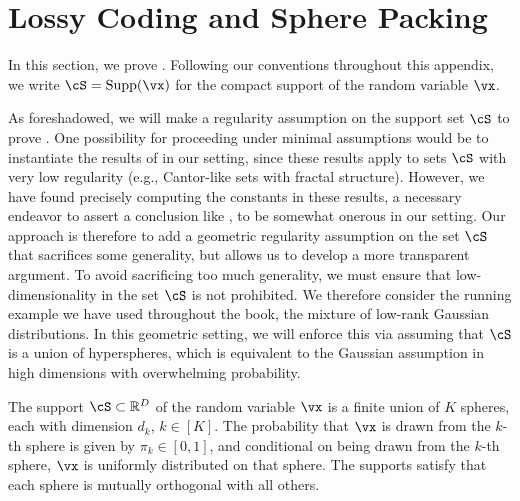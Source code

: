 \documentclass[../../book-main.tex]{subfiles}
\begin{document}
\section{Lossy Coding and Sphere Packing}\label{app:rate-distortion-covering}

In this section, we prove .
Following our conventions throughout this appendix, we write $\cS = \Supp(\vx)$
for the compact support of the random variable $\vx$.

As foreshadowed, we will make a regularity assumption on the support set $\cS$
to prove . One possibility for
proceeding under minimal assumptions would be to instantiate the results of
\cite{Riegler2018-jh,Riegler2023-rr} in our setting, since these results apply
to sets $\cS$ with very low regularity (e.g., Cantor-like sets with fractal
structure). However, we have found precisely computing the constants in these
results, a necessary endeavor to assert a conclusion like
, to be somewhat onerous in our
setting.
Our approach is therefore to add a geometric regularity assumption on
the set $\cS$ that sacrifices some generality, but allows us to develop
a more transparent argument. To avoid sacrificing too much generality, we must
ensure that low-dimensionality in the set $\cS$ is not prohibited. 
We therefore consider the running example we have used throughout the book, the
mixture of low-rank Gaussian distributions. In this geometric setting, we will
enforce this via assuming that $\cS$ is a union of hyperspheres, which is
equivalent to the Gaussian assumption in high dimensions with overwhelming
probability.

\begin{assumption}\label{assumption:union-of-spheres}
    The support $\cS \subset \R^D$ of the random variable $\vx$ is a finite
    union of $K$ spheres, each with dimension $d_k$, $k \in [K]$.
    The probability that $\vx$ is drawn from the $k$-th sphere is given by
    $\pi_k \in [0, 1]$, and conditional on being drawn from the $k$-th sphere,
    $\vx$ is uniformly distributed on that sphere.
    The supports satisfy that each sphere is mutually orthogonal with all
    others.
\end{assumption}
\end{document}
